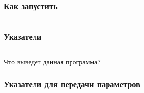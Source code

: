 \documentclass[aspectratio=169]{beamer}
\begin{document}
\begin{frame}
    \frametitle{Как запустить}

    \inputminted{console}{01_basic_c_trace.txt}

\end{frame}

\begin{frame}
    \frametitle{Указатели}

    \inputminted{c}{01_pointers_question.c}

    \vspace{1em}

    \alert{Что выведет данная программа?}

\end{frame}



\begin{frame}
    \frametitle{Указатели для передачи параметров}

    \inputminted[fontsize=\small]{c}{01_pointers_basic.c}

\end{frame}









\end{document}
